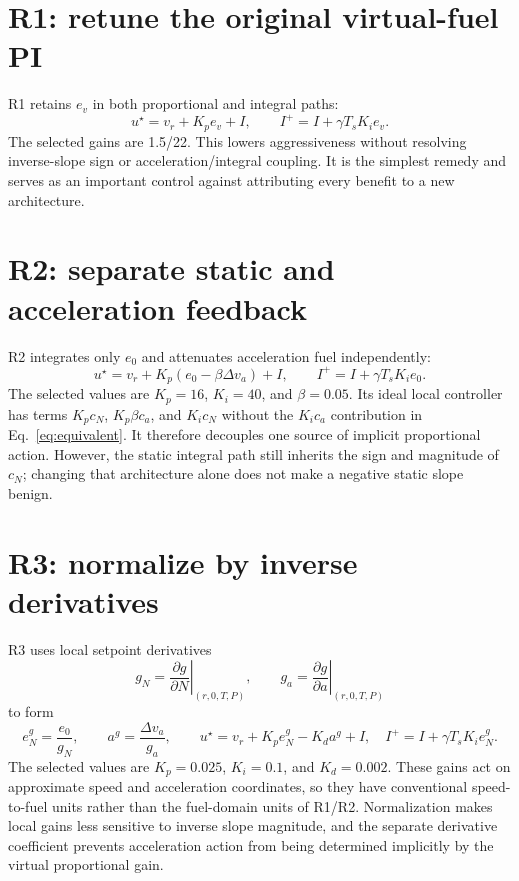 \documentclass[11pt,a4paper,oneside]{report}
\begin{document}
\section{R1: retune the original virtual-fuel PI}
R1 retains $e_v$ in both proportional and integral paths:
\begin{equation}
u^\star=v_r+K_pe_v+I,\qquad I^+=I+\gamma T_sK_ie_v.
\end{equation}
The selected gains are 1.5/22. This lowers aggressiveness without resolving inverse-slope sign or acceleration/integral coupling. It is the simplest remedy and serves as an important control against attributing every benefit to a new architecture.

\section{R2: separate static and acceleration feedback}
R2 integrates only $e_0$ and attenuates acceleration fuel independently:
\begin{equation}
u^\star=v_r+K_p(e_0-\beta\Delta v_a)+I,\qquad
I^+=I+\gamma T_sK_ie_0.
\end{equation}
The selected values are $K_p=16$, $K_i=40$, and $\beta=0.05$. Its ideal local controller has terms $K_pc_N$, $K_p\beta c_a$, and $K_ic_N$ without the $K_ic_a$ contribution in Eq.~\eqref{eq:equivalent}. It therefore decouples one source of implicit proportional action. However, the static integral path still inherits the sign and magnitude of $c_N$; changing that architecture alone does not make a negative static slope benign.

\section{R3: normalize by inverse derivatives}
R3 uses local setpoint derivatives
\begin{equation}
g_N=\left.\frac{\partial g}{\partial N}\right|_{(r,0,T,P)},\qquad
g_a=\left.\frac{\partial g}{\partial a}\right|_{(r,0,T,P)}
\end{equation}
to form
\begin{equation}
e_N^g=\frac{e_0}{g_N},\qquad a^g=\frac{\Delta v_a}{g_a},\qquad
u^\star=v_r+K_pe_N^g-K_da^g+I,
\quad I^+=I+\gamma T_sK_ie_N^g.
\label{eq:r3}
\end{equation}
The selected values are $K_p=0.025$, $K_i=0.1$, and $K_d=0.002$. These gains act on approximate speed and acceleration coordinates, so they have conventional speed-to-fuel units rather than the fuel-domain units of R1/R2. Normalization makes local gains less sensitive to inverse slope magnitude, and the separate derivative coefficient prevents acceleration action from being determined implicitly by the virtual proportional gain.
\end{document}
